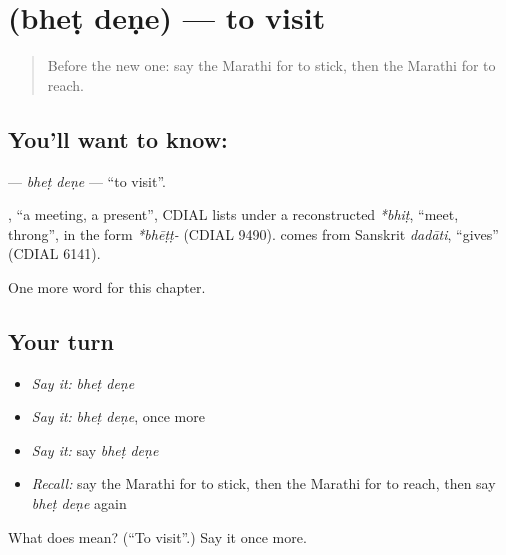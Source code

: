 \section[\texorpdfstring{\mr{भेट} \mr{देणे} (bheṭ deṇe)}{भेट देणे (bheṭ deṇe)}]{  (bheṭ deṇe) — to visit}

\label{lesson:MR-C199-bhet-dene}



\begin{quote}
Before the new one: say the Marathi for to stick, then the Marathi for to reach.
\end{quote}

\subsection*{You'll want to know:  }
\textbf{ } — \emph{bheṭ deṇe} — \textquotedblleft{}to visit\textquotedblright{}.

\begin{cousinweb}
\textbf{}, \textquotedblleft{}a meeting, a present\textquotedblright{}, CDIAL lists under a reconstructed \emph{*bhiṭ}, \textquotedblleft{}meet, throng\textquotedblright{}, in the form \emph{*bhēṭṭ-} (CDIAL 9490). \textbf{} comes from Sanskrit \emph{dadāti}, \textquotedblleft{}gives\textquotedblright{} (CDIAL 6141).
\end{cousinweb}

\begin{grammarlens}[title={What you've built}]
One more word for this chapter.
\end{grammarlens}

\subsection*{Your turn}
\begin{itemize}
\raggedright
  \item \emph{Say it:} \emph{bheṭ deṇe}
  \item \emph{Say it:} \emph{bheṭ deṇe}, once more
  \item \emph{Say it:} say \emph{bheṭ deṇe}
  \item \emph{Recall:} say the Marathi for to stick, then the Marathi for to reach, then say \emph{bheṭ deṇe} again
\end{itemize}

\begin{tcolorbox}[breakable,colback=teal!4,colframe=teal!35!black,title={Before you move on}]
What does   mean? (\textquotedblleft{}To visit\textquotedblright{}.) Say it once more.
\end{tcolorbox}
